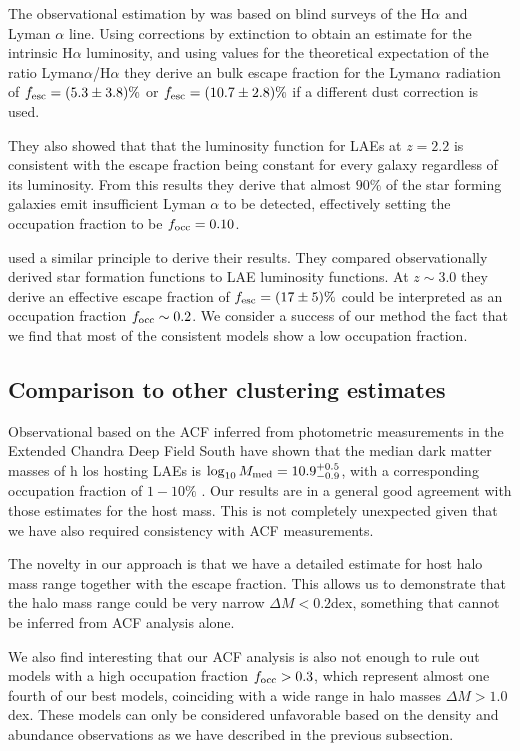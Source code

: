 \documentclass[usenatbib]{mn2e}
\newcommand{\Msun}{{\ifmmode{{\rm {M_{\odot}}}}\else{${\rm{M_{\odot}}}$}\fi}}
\begin{document}
The observational estimation by \cite{Hayes2010} was based on blind
surveys of the H$\alpha$ and Lyman $\alpha$ line. Using corrections by
extinction to obtain an estimate for the intrinsic H$\alpha$
luminosity, and using values for the theoretical expectation of the
ratio Lyman$\alpha$/H$\alpha$ they derive an bulk escape fraction for
the Lyman$\alpha$ radiation of $f_{\rm esc}=(5.3\pm 3.8)\%$ or $f_{\rm
  esc}=(10.7\pm 2.8)\%$ if a different dust correction is used. 

They also showed that that the luminosity function for LAEs at $z=2.2$ is
consistent with the escape fraction being constant for every galaxy
regardless of its luminosity. From this results they derive that
almost $90\%$ of the star forming galaxies emit insufficient
Lyman $\alpha$ to be detected, effectively setting the occupation
fraction to be $f_{\rm occ}=0.10$.  

\cite{Dijkstra2013} used a similar principle to derive their results. They
compared observationally derived star formation functions to LAE
luminosity functions. At $z\sim 3.0$ they derive an effective escape
fraction of $f_{\rm esc}=(17\pm 5)\%$ could be interpreted as an
occupation fraction $f_{\rm occ}\sim 0.2$.  We consider a success of
our method the fact that we find that most of the consistent models
show a low occupation fraction.    



\subsection{Comparison to other clustering estimates}

Observational based on the ACF inferred from photometric measurements
in the Extended Chandra Deep Field South have shown that the median
dark matter masses of h los hosting LAEs is $\log_{10}M_{\rm
  med}=10.9^{+0.5}_{-0.9}$\Msun, with a corresponding occupation
fraction of $1-10\%$  \citep{Gawiser07}.  Our results are in a general
good agreement with those estimates for the host mass. This is not
completely unexpected given that we have also required consistency
with ACF measurements.   

The novelty in our approach is that we have a detailed estimate for 
host halo mass range together with the escape fraction. This allows us
to demonstrate that the halo mass range could be very narrow $\Delta M <
0.2$dex, something that cannot be inferred from ACF analysis
alone. 

We also find interesting that our ACF analysis is also not enough to rule
out models with a high occupation fraction $f_{\rm occ}>0.3$, which
represent almost one fourth of our best models, coinciding with a wide
range in halo masses $\Delta M>1.0$ dex. These models can only be
considered unfavorable based on the density and abundance observations
as we have described in the previous subsection.
\end{document}
